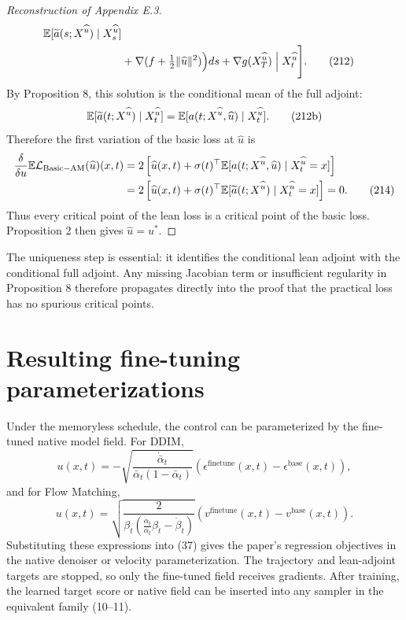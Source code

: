 \begin{proof}[Reconstruction of Appendix E.3]
\begin{align*}
 \mathbb{E}[\widetilde a(s;X^{\widehat u})\mid X_s^{\widehat u}]\\
 &+\nabla(f+\tfrac12\|\widehat u\|^2)
 \Big)ds+\nabla g(X_T^{\widehat u})
 \Bigm|X_t^{\widehat u}\Bigg].
 \tag{212}
\end{align*}
By Proposition 8, this solution is the conditional mean of the full adjoint:
\begin{equation*}
 \mathbb{E}[\widetilde a(t;X^{\widehat u})\mid X_t^{\widehat u}]
 =\mathbb{E}[a(t;X^{\widehat u},\widehat u)\mid X_t^{\widehat u}].
 \tag{212b}
\end{equation*}
Therefore the first variation of the basic loss at $\widehat u$ is
\begin{align*}
 \frac{\delta}{\delta u}\mathbb{E}\mathcal L_{\mathrm{Basic-AM}}(\widehat u)(x,t)
 &=2\left[
 \widehat u(x,t)+\sigma(t)^\top
 \mathbb{E}[a(t;X^{\widehat u},\widehat u)\mid X_t^{\widehat u}=x]
 \right]\\
 &=2\left[
 \widehat u(x,t)+\sigma(t)^\top
 \mathbb{E}[\widetilde a(t;X^{\widehat u})\mid X_t^{\widehat u}=x]
 \right]=0.
 \tag{214}
\end{align*}
Thus every critical point of the lean loss is a critical point of the basic loss.  Proposition 2 then gives $\widehat u=u^*$.
\end{proof}

\begin{remark}
The uniqueness step is essential: it identifies the conditional lean adjoint with the conditional full adjoint.  Any missing Jacobian term or insufficient regularity in Proposition 8 therefore propagates directly into the proof that the practical loss has no spurious critical points.
\end{remark}

\section{Resulting fine-tuning parameterizations}

Under the memoryless schedule, the control can be parameterized by the fine-tuned native model field.  For DDIM,
\begin{equation*}
 u(x,t)=
 -\sqrt{\frac{\dot{\bar\alpha}_t}{\bar\alpha_t(1-\bar\alpha_t)}}
 \left(\epsilon^{\mathrm{finetune}}(x,t)-\epsilon^{\mathrm{base}}(x,t)\right),
 \tag{26}
\end{equation*}
and for Flow Matching,
\begin{equation*}
 u(x,t)=
 \sqrt{\frac{2}{\beta_t(\frac{\dot\alpha_t}{\alpha_t}\beta_t-\dot\beta_t)}}
 \left(v^{\mathrm{finetune}}(x,t)-v^{\mathrm{base}}(x,t)\right).
 \tag{27}
\end{equation*}
Substituting these expressions into (37) gives the paper's regression objectives in the native denoiser or velocity parameterization.  The trajectory and lean-adjoint targets are stopped, so only the fine-tuned field receives gradients.  After training, the learned target score or native field can be inserted into any sampler in the equivalent family (10--11).

